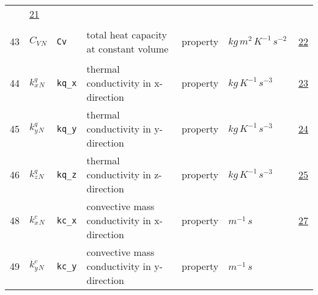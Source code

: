 \begin{longtable}{|p{1cm}|p{2.5cm}|p{4.5cm}|p{8cm}|p{3.0cm}|p{3cm}|p{1cm}|}
             &                 \hyperlink{"e:21"}{ 21 }
                 \\
            43
             & \hypertarget{"v:43"}{ $ {{C_V}}{_{N}} $}
             & \verb|Cv|
             & total heat capacity at constant volume
             & \begin{lay}property \end{lay}
             & $ kg \,m^{2} \,K^{-1} \,s^{-2} \, $
             &                 \hyperlink{"e:22"}{ 22 }
                 \\
            44
             & \hypertarget{"v:44"}{ $ {{k^q_x}}{_{N}} $}
             & \verb|kq_x|
             & thermal conductivity in x-direction
             & \begin{lay}property \end{lay}
             & $ kg \,K^{-1} \,s^{-3} \, $
             &                 \hyperlink{"e:23"}{ 23 }
                 \\
            45
             & \hypertarget{"v:45"}{ $ {{k^q_y}}{_{N}} $}
             & \verb|kq_y|
             & thermal conductivity in y-direction
             & \begin{lay}property \end{lay}
             & $ kg \,K^{-1} \,s^{-3} \, $
             &                 \hyperlink{"e:24"}{ 24 }
                 \\
            46
             & \hypertarget{"v:46"}{ $ {{k^q_z}}{_{N}} $}
             & \verb|kq_z|
             & thermal conductivity in z-direction
             & \begin{lay}property \end{lay}
             & $ kg \,K^{-1} \,s^{-3} \, $
             &                 \hyperlink{"e:25"}{ 25 }
                 \\
            48
             & \hypertarget{"v:48"}{ $ {{k^c_x}}{_{N}} $}
             & \verb|kc_x|
             & convective mass conductivity in x-direction
             & \begin{lay}property \end{lay}
             & $ m^{-1} \,s \, $
             &                 \hyperlink{"e:27"}{ 27 }
                 \\
            49
             & \hypertarget{"v:49"}{ $ {{k^c_y}}{_{N}} $}
             & \verb|kc_y|
             & convective mass conductivity in y-direction
             & \begin{lay}property \end{lay}
             & $ m^{-1} \,s \, $

\end{longtable}
